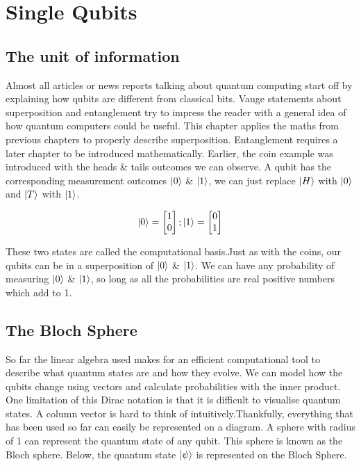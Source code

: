
\chapter{Single Qubits}

\section{ The unit of information}

Almost all articles or news reports talking about quantum computing start off by explaining how qubits are different from classical bits. Vauge statements about superposition and entanglement try to impress the reader with a general idea of how quantum computers could be useful. This chapter applies the maths from previous chapters to properly describe superposition. Entanglement requires a later chapter to be introduced mathematically. Earlier, the coin example was introduced with the heads \& tails outcomes we can observe. A qubit has the corresponding measurement outcomes $\ket{0}$ \& $\ket{1}$, we can just replace $\ket{H}$ with $\ket{0}$ and $\ket{T}$ with $\ket{1}$. 

$$
\ket{0} = \begin{bmatrix} 1 \\ 0 \end{bmatrix} ; \ket{1} = \begin{bmatrix} 0 \\ 1 \end{bmatrix} 
$$

These two states are called the computational basis.Just as with the coins, our qubits can be in a superposition of $\ket{0}$ \& $\ket{1}$. We can have any probability of measuring $\ket{0}$ \& $\ket{1}$, so long as all the probabilities are real positive numbers which add to 1. 

\section{ The Bloch Sphere }

So far the linear algebra used makes for an efficient computational tool to describe what quantum states are and how they evolve. We can model how the qubits change using vectors and calculate probabilities with the inner product. One limitation of this Dirac notation is that it is difficult to visualise quantum states. A column vector is hard to think of intuitively.Thankfully, everything that has been used so far can easily be represented on a diagram. A sphere with radius of 1 can represent the quantum state of any qubit. This sphere is known as the Bloch sphere. Below, the quantum state $\ket{\psi}$ is represented on the Bloch Sphere. 

